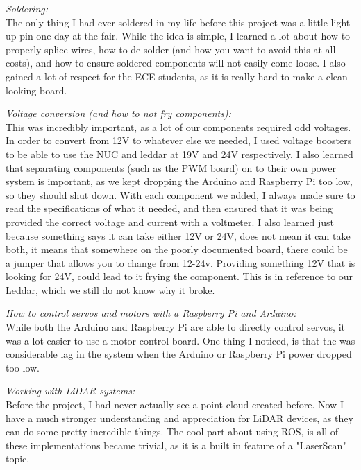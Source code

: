 \documentclass[compsoc,draftclsnofoot,onecolumn,10pt]{IEEEtran}
\begin{document}
\textit{Soldering:\\}
The only thing I had ever soldered in my life before this project was a little light-up pin one day at the fair.
While the idea is simple, I learned a lot about how to properly splice wires, how to de-solder (and how you want to avoid this at all costs), and how to ensure soldered components will not easily come loose. I also gained a lot of respect for the ECE students, as it is really hard to make a clean looking board.

\textit{Voltage conversion (and how to not fry components):\\}
This was incredibly important, as a lot of our components required odd voltages. In order to convert from 12V to whatever else we needed, I used voltage boosters to be able to use the NUC and leddar at 19V and 24V respectively. I also learned that separating components (such as the PWM board) on to their own power system is important, as we kept dropping the Arduino and Raspberry Pi too low, so they should shut down. With each component we added, I always made sure to read the specifications of what it needed, and then ensured that it was being provided the correct voltage and current with a voltmeter. I also learned just because something says it can take either 12V or 24V, does not mean it can take both, it means that somewhere on the poorly documented board, there could be a jumper that allows you to change from 12-24v. Providing something 12V that is looking for 24V, could lead to it frying the component. This is in reference to our Leddar, which we still do not know why it broke.

\textit{How to control servos and motors with a Raspberry Pi and Arduino:\\}
While both the Arduino and Raspberry Pi are able to directly control servos, it was a lot easier to use a motor control board. One thing I noticed, is that the was considerable lag in the system when the Arduino or Raspberry Pi power dropped too low.

\textit{Working with LiDAR systems:\\}
Before the project, I had never actually see a point cloud created before. Now I have a much stronger understanding and appreciation for LiDAR devices, as they can do some pretty incredible things. The cool part about using ROS, is all of these implementations became trivial, as it is a built in feature of a "LaserScan" topic.
\end{document}
